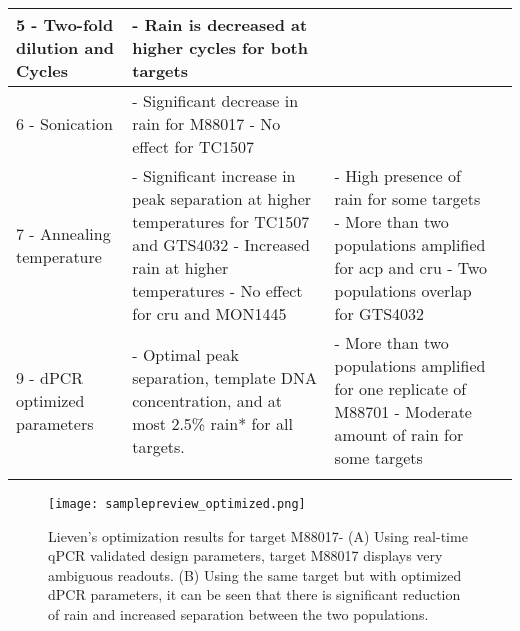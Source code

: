 \begin{table}
\begin{tabularx}{\textwidth}{p{3.2cm}*{3}{X}}
        \hline
        5 - Two-fold dilution and Cycles  & - Rain is decreased at higher   cycles for both targets                                                                                                                                                                     &                                                                                                                                                                                                    \\
        \hline
        6 - Sonication                                                                     & - Significant decrease in rain for   M88017 \newline - No effect for TC1507                                                                                                          &                                                                                                                                                                                                    \\
        \hline
        7 - Annealing \newline temperature         & - Significant increase in peak   separation at higher temperatures for TC1507 and GTS4032 \newline - Increased rain at higher   temperatures \newline - No effect for cru and MON1445 & - High presence of rain for some   targets \newline - More than two populations   amplified for acp and cru \newline- Two populations overlap for   GTS4032 \\
        \hline
        9 - dPCR optimized parameters     & - Optimal peak separation, template   DNA concentration, and at most 2.5\% rain* for all targets.                                                                                                                           & - More than two populations   amplified for one replicate of M88701 \newline - Moderate amount of rain for some   targets                                   \\
        \arrayrulecolor{black}
        \bottomrule    
    \end{tabularx}
    \label{tab:realdata_summarizedresults}
\end{table}

\begin{figure}
    \centering
    \texttt{[image: samplepreview\_optimized.png]}
    \caption[Lieven's optimization results for target M88017]%
    {Lieven's optimization results for target M88017- (A) Using real-time qPCR validated design parameters, target M88017 displays very ambiguous readouts. (B) Using the same target but with optimized dPCR parameters, it can be seen that there is significant reduction of rain and increased separation between the two populations.}
     \label{fig:samplepreview_optimized}
\end{figure}

